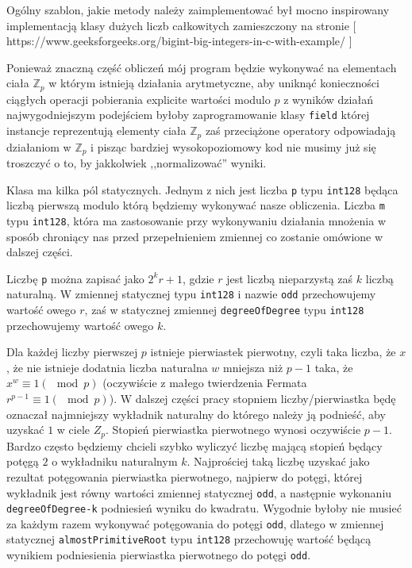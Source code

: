 \documentclass{article}
\begin{document}
Ogólny szablon, jakie metody należy zaimplementować był 
mocno inspirowany implementacją klasy dużych liczb całkowitych
zamieszczony na stronie [ https://www.geeksforgeeks.org/bigint-big-integers-in-c-with-example/ ]


Ponieważ znaczną część obliczeń mój program będzie wykonywać na elementach ciała
$\mathbb{Z}_p$ w którym istnieją działania arytmetyczne, aby uniknąć konieczności ciągłych operacji pobierania explicite
wartości modulo $p$ z wyników działań najwygodniejszym podejściem byłoby zaprogramowanie klasy \texttt{field} której instancje
reprezentują elementy ciała $\mathbb{Z}_p$ zaś przeciążone operatory odpowiadają działaniom w $\mathbb{Z}_p$ i pisząc bardziej 
wysokopoziomowy kod nie musimy już się troszczyć o to, by jakkolwiek ,,normalizować'' wyniki. 


Klasa ma kilka pól statycznych. Jednym z nich jest liczba \texttt{p} typu \texttt{\textunderscore \textunderscore int128}
będąca liczbą pierwszą modulo którą będziemy wykonywać nasze obliczenia. Liczba \texttt{m} typu 
\texttt{\textunderscore \textunderscore int128}, która ma zastosowanie przy wykonywaniu działania mnożenia w sposób
chroniący nas przed przepełnieniem zmiennej co zostanie omówione w dalszej części. 

Liczbę \texttt{p} można zapisać jako $2^kr+1$, gdzie $r$ jest liczbą nieparzystą zaś $k$ liczbą naturalną.
W zmiennej statycznej typu \texttt{\textunderscore \textunderscore int128} i nazwie \texttt{odd} przechowujemy
wartość owego $r$, zaś w statycznej zmiennej \texttt{degreeOfDegree} typu
\texttt{\textunderscore \textunderscore int128} przechowujemy wartość owego $k$.

Dla każdej liczby pierwszej $p$ istnieje pierwiastek pierwotny, czyli taka liczba, że $x$, że nie istnieje 
dodatnia liczba naturalna $w$ mniejsza niż $p-1$ taka, że $x^w \equiv 1 (\mod p)$ (oczywiście z małego twierdzenia
Fermata $r^{p-1} \equiv 1 (\mod p)$). W dalszej części pracy stopniem liczby/pierwiastka będę oznaczał najmniejszy wykładnik
naturalny do którego należy ją podnieść, aby uzyskać $1$ w ciele $Z_p$. Stopień pierwiastka pierwotnego wynosi 
oczywiście $p-1$. Bardzo często będziemy chcieli szybko wyliczyć liczbę mającą stopień będący potęgą $2$ o 
wykładniku naturalnym $k$. Najprościej taką liczbę uzyskać jako rezultat potęgowania pierwiastka pierwotnego,
najpierw do potęgi, której wykładnik jest równy wartości zmiennej statycznej \texttt{odd}, a następnie
wykonaniu \texttt{degreeOfDegree-k}  podniesień wyniku do kwadratu. Wygodnie byłoby nie musieć za każdym razem
wykonywać potęgowania do potęgi \texttt{odd}, dlatego w zmiennej statycznej \texttt{almostPrimitiveRoot}
typu \texttt{\textunderscore \textunderscore int128} przechowuję wartość będącą wynikiem podniesienia pierwiastka
pierwotnego do potęgi \texttt{odd}.
\end{document}
